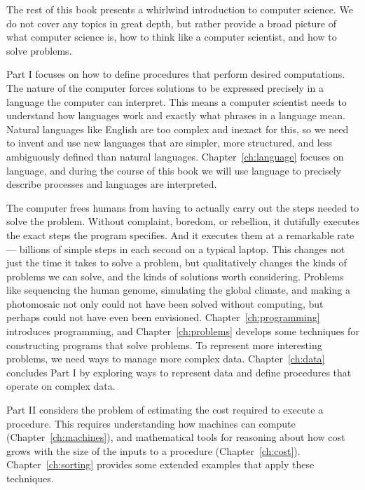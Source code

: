 The rest of this book presents a whirlwind introduction to computer science.  We do not cover any topics in great depth, but rather provide a broad picture of what computer science is, how to think like a computer scientist, and how to solve problems.  

 Part I focuses on how to define procedures that perform desired computations.  The nature of the computer forces solutions to be expressed precisely in a language the computer can interpret.  This means a computer scientist needs to understand how languages work and exactly what phrases in a language mean.  Natural languages like English are too complex and inexact for this, so we need to invent and use new languages that are simpler, more structured, and less ambiguously defined than natural languages.  Chapter~\ref{ch:language} focuses on language, and during the course of this book we will use language to precisely describe processes and languages are interpreted.

The computer frees humans from having to actually carry out the steps needed to solve the problem.  Without complaint, boredom, or rebellion, it dutifully executes the exact steps the program specifies.  And it executes them at a remarkable rate --- billions of simple steps in each second on a typical laptop.  This changes not just the time it takes to solve a problem, but qualitatively changes the kinds of problems we can solve, and the kinds of solutions worth considering.  Problems like sequencing the human genome, simulating the global climate, and making a photomosaic not only could not have been solved without computing, but perhaps could not have even been envisioned.  Chapter~\ref{ch:programming} introduces programming, and Chapter~\ref{ch:problems} develops some techniques for constructing programs that solve problems.  To represent more interesting problems, we need ways to manage more complex data.  Chapter~\ref{ch:data} concludes Part I by exploring ways to represent data and define procedures that operate on complex data.

 Part II considers the problem of estimating the cost required to execute a procedure.  This requires understanding how machines can compute (Chapter~\ref{ch:machines}), and mathematical tools for reasoning about how cost grows with the size of the inputs to a procedure (Chapter~\ref{ch:cost}).  Chapter~\ref{ch:sorting} provides some extended examples that apply these techniques.

